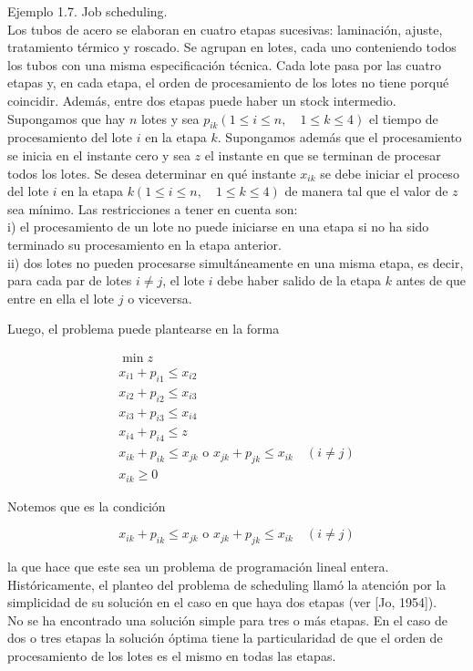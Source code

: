 \documentclass[10pt]{article}
\begin{document}
Ejemplo 1.7. Job scheduling.\\
Los tubos de acero se elaboran en cuatro etapas sucesivas: laminación, ajuste, tratamiento térmico y roscado. Se agrupan en lotes, cada uno conteniendo todos los tubos con una misma especificación técnica. Cada lote pasa por las cuatro etapas y, en cada etapa, el orden de procesamiento de los lotes no tiene porqué coincidir. Además, entre dos etapas puede haber un stock intermedio.\\
Supongamos que hay $n$ lotes y sea $p_{i k}(1 \leq i \leq n, \quad 1 \leq k \leq 4)$ el tiempo de procesamiento del lote $i$ en la etapa $k$. Supongamos además que el procesamiento se inicia en el instante cero y sea $z$ el instante en que se terminan de procesar todos los lotes. Se desea determinar en qué instante $x_{i k}$ se debe iniciar el proceso del lote $i$ en la etapa $k(1 \leq i \leq n, \quad 1 \leq k \leq 4)$ de manera tal que el valor de $z$ sea mínimo. Las restricciones a tener en cuenta son:\\
i) el procesamiento de un lote no puede iniciarse en una etapa si no ha sido terminado su procesamiento en la etapa anterior.\\
ii) dos lotes no pueden procesarse simultáneamente en una misma etapa, es decir, para cada par de lotes $i \neq j$, el lote $i$ debe haber salido de la etapa $k$ antes de que entre en ella el lote $j$ o viceversa.

Luego, el problema puede plantearse en la forma

$$
\begin{gathered}
\min z \\
x_{i 1}+p_{i 1} \leq x_{i 2} \\
x_{i 2}+p_{i 2} \leq x_{i 3} \\
x_{i 3}+p_{i 3} \leq x_{i 4} \\
x_{i 4}+p_{i 4} \leq z \\
x_{i k}+p_{i k} \leq x_{j k} \text { o } x_{j k}+p_{j k} \leq x_{i k} \quad(i \neq j) \\
x_{i k} \geq 0
\end{gathered}
$$

Notemos que es la condición

$$
x_{i k}+p_{i k} \leq x_{j k} \text { o } x_{j k}+p_{j k} \leq x_{i k} \quad(i \neq j)
$$

la que hace que este sea un problema de programación lineal entera. Históricamente, el planteo del problema de scheduling llamó la atención por la simplicidad de su solución en el caso en que haya dos etapas (ver [Jo, 1954]).\\
No se ha encontrado una solución simple para tres o más etapas. En el caso de dos o tres etapas la solución óptima tiene la particularidad de que el orden de procesamiento de los lotes es el mismo en todas las etapas.
\end{document}
